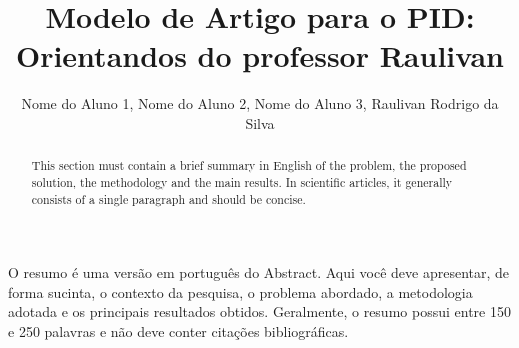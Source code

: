 \documentclass[12pt]{article}
\title{Modelo de Artigo para o PID: Orientandos do professor Raulivan}
\author{Nome do Aluno 1\inst{1}, Nome do Aluno 2\inst{1}, Nome do Aluno 3\inst{1}, Raulivan Rodrigo da Silva\inst{1}}
\begin{document}
\maketitle

\begin{abstract}
  This section must contain a brief summary in English of the problem, the proposed solution, the methodology and the main results. In scientific articles, it generally consists of a single paragraph and should be concise.
\end{abstract}

\begin{resumo}
  O resumo é uma versão em português do Abstract. Aqui você deve apresentar, de forma sucinta, o contexto da pesquisa, o problema abordado, a metodologia adotada e os principais resultados obtidos. Geralmente, o resumo possui entre 150 e 250 palavras e não deve conter citações bibliográficas.
\end{resumo}










\end{document}
